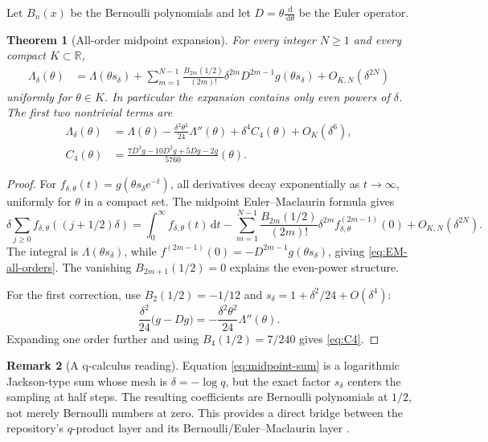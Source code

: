 \documentclass[11pt,a4paper]{article}
\newtheorem{theorem}{Theorem}[section]
\theoremstyle{definition}
\newtheorem{remark}[theorem]{Remark}
\newcommand{\R}{\mathbb{R}}
\newcommand{\dd}{\,\mathrm{d}}
\newcommand{\1}{\mathbf{1}}
\begin{document}
Let $B_n(x)$ be the Bernoulli polynomials and let
$D=\theta\frac{\dd}{\dd\theta}$ be the Euler operator.

\begin{theorem}[All-order midpoint expansion]
\label{thm:midpoint-EM}
For every integer $N\ge1$ and every compact $K\subset\R$,
\begin{align}
 \Lambda_\delta(\theta)
 &=\Lambda(\theta s_\delta)
 +\sum_{m=1}^{N-1}
   \frac{B_{2m}(1/2)}{(2m)!}\delta^{2m}
   D^{2m-1}g(\theta s_\delta)
 +O_{K,N}(\delta^{2N})
 \label{eq:EM-all-orders}
\end{align}
uniformly for $\theta\in K$.  In particular the expansion contains only
even powers of $\delta$.  The first two nontrivial terms are
\begin{align}
 \Lambda_\delta(\theta)
 &=\Lambda(\theta)
 -\frac{\delta^2\theta^2}{24}\Lambda''(\theta)
 +\delta^4 C_4(\theta)+O_K(\delta^6),
 \label{eq:Lambda-two-corrections}\\
 C_4(\theta)
 &=\frac{7D^3g-10D^2g+5Dg-2g}{5760}(\theta).
 \label{eq:C4}
\end{align}
\end{theorem}

\begin{proof}
For
$f_{\delta,\theta}(t)=g(\theta s_\delta e^{-t})$, all derivatives decay
exponentially as $t\to\infty$, uniformly for $\theta$ in a compact set.
The midpoint Euler--Maclaurin formula \cite{Olver} gives
\begin{equation}
 \delta\sum_{j\ge0}f_{\delta,\theta}((j+1/2)\delta)
 =\int_0^\infty f_{\delta,\theta}(t)\dd t
 -\sum_{m=1}^{N-1}
   \frac{B_{2m}(1/2)}{(2m)!}\delta^{2m}
   f_{\delta,\theta}^{(2m-1)}(0)
 +O_{K,N}(\delta^{2N}).
 \label{eq:midpoint-EM-proof}
\end{equation}
The integral is $\Lambda(\theta s_\delta)$, while
$f^{(2m-1)}(0)=-D^{2m-1}g(\theta s_\delta)$, giving
\eqref{eq:EM-all-orders}.  The vanishing
$B_{2m+1}(1/2)=0$ explains the even-power structure.

For the first correction, use $B_2(1/2)=-1/12$ and
$s_\delta=1+\delta^2/24+O(\delta^4)$:
\[
 \frac{\delta^2}{24}\bigl(g-Dg\bigr)
 =-\frac{\delta^2\theta^2}{24}\Lambda''(\theta).
\]
Expanding one order further and using
$B_4(1/2)=7/240$ gives \eqref{eq:C4}.
\end{proof}

\begin{remark}[A q-calculus reading]
Equation \eqref{eq:midpoint-sum} is a logarithmic Jackson-type sum whose mesh
is $\delta=-\log q$, but the exact factor $s_\delta$ centers the sampling at
half steps.  The resulting coefficients are Bernoulli polynomials at
$1/2$, not merely Bernoulli numbers at zero.  This provides a direct bridge
between the repository's $q$-product layer and its Bernoulli/Euler--Maclaurin
layer \cite{GasperRahman}.
\end{remark}
\end{document}
